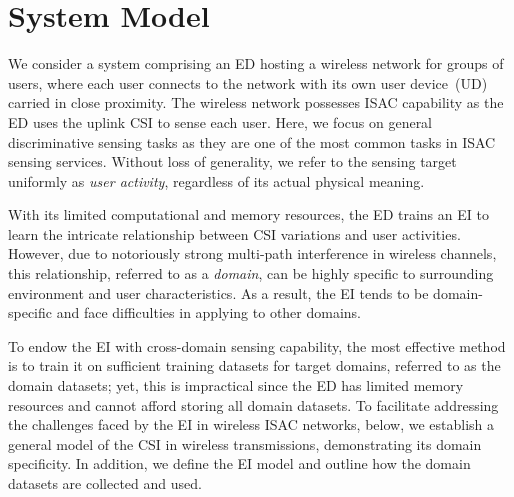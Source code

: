 \section{System Model}\label{sec_sysmod}

We consider a system comprising an ED hosting a wireless network for groups of users, where each user connects to the network with its own user device~(UD) carried in close proximity.
The wireless network possesses ISAC capability as the ED uses the uplink CSI to sense each user.
Here, we focus on general discriminative sensing tasks as they are one of the most common tasks in ISAC sensing services.
Without loss of generality, we refer to the sensing target uniformly as \emph{user activity}, regardless of its actual physical meaning.

With its limited computational and memory resources, the ED trains an EI to learn the intricate relationship between CSI variations and user activities. 
However, due to notoriously strong multi-path interference in wireless channels, this relationship, referred to as a \emph{domain}, can be highly specific to surrounding environment and user characteristics.
As a result, the EI tends to be domain-specific and face difficulties in applying to other domains.

To endow the EI with cross-domain sensing capability, the most effective method is to train it on sufficient training datasets for target domains, referred to as the domain datasets; yet, this is impractical since the ED has limited memory resources and cannot afford storing all domain datasets.
%
To facilitate addressing the challenges faced by the EI in wireless ISAC networks, below, we establish a general model of the CSI in wireless transmissions, demonstrating its domain specificity.
In addition, we define the EI model and outline how the domain datasets are collected and used.



